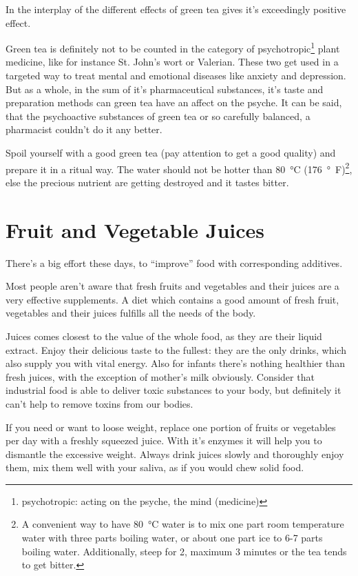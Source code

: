 \documentclass[../main.tex]{subfiles}
\begin{document}
In the interplay of the different effects of green tea gives it's exceedingly positive effect.

Green tea is definitely not to be counted in the category of psychotropic\footnote{psychotropic: acting on the psyche, the mind (medicine)}
plant medicine, like for instance St. John's wort or Valerian.
These two get used in a targeted way to treat mental and emotional diseases like anxiety and depression.
But as a whole, in the sum of it's pharmaceutical substances, it's taste and preparation methods can green tea have an affect on the psyche.
It can be said, that the psychoactive substances of green tea or so carefully balanced, a pharmacist couldn't do it any better.

Spoil yourself with a good green tea (pay attention to get a good quality) and prepare it in a ritual way.
The water should not be hotter than \SI{80}{\celsius} (\SI{176}{\degree F})\footnote{A convenient way to have \SI{80}{\celsius} water
is to mix one part room temperature water with three parts boiling water, or about one part ice to 6-7 parts boiling water.
Additionally, steep for 2, maximum 3 minutes or the tea tends to get bitter.},
else the precious nutrient are getting destroyed and it tastes bitter\cite{GreenTee}.

\section{Fruit and Vegetable Juices}

There's a big effort these days, to ``improve'' food with corresponding additives.

Most people aren't aware that fresh fruits and vegetables and their juices are a very effective supplements.
A diet which contains a good amount of fresh fruit, vegetables and their juices fulfills all the needs of the body.

Juices comes closest to the value of the whole food, as they are their liquid extract.
Enjoy their delicious taste to the fullest: they are the only drinks, which also supply you with vital energy.
Also for infants there's nothing healthier than fresh juices, with the exception of mother's milk obviously.
Consider that industrial food is able to deliver toxic substances to your body, but definitely it can't help
to remove toxins from our bodies.

If you need or want to loose weight, replace one portion of fruits or vegetables per day with a freshly squeezed juice.
With it's enzymes it will help you to dismantle the excessive weight.
Always drink juices slowly and thoroughly enjoy them, mix them well with your saliva, as if you would chew solid food.
\end{document}
